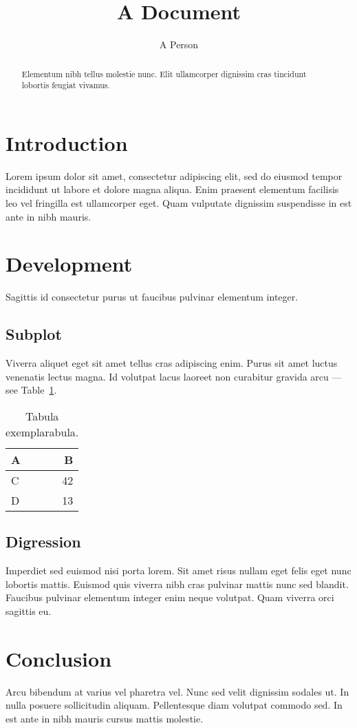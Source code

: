 \documentclass{article}
\title{A Document}
\author{A Person}
\begin{document}
\maketitle

\begin{abstract}
Elementum nibh tellus molestie nunc. Elit ullamcorper dignissim cras tincidunt lobortis feugiat vivamus.
\end{abstract}

\section{Introduction}

Lorem ipsum dolor sit amet, consectetur adipiscing elit, sed do eiusmod tempor incididunt ut labore et dolore magna aliqua. Enim praesent elementum facilisis leo vel fringilla est ullamcorper eget. Quam vulputate dignissim suspendisse in est ante in nibh mauris. 

\section{Development}

Sagittis id consectetur purus ut faucibus pulvinar elementum integer.

\subsection{Subplot}

Viverra aliquet eget sit amet tellus cras adipiscing enim. Purus sit amet luctus venenatis lectus magna. Id volutpat lacus laoreet non curabitur gravida arcu --- see Table~\ref{tab:widgets}.

\begin{table}[h]
\centering
\begin{tabular}{l|r}
A & B \\\hline
C & 42 \\
D & 13
\end{tabular}
\caption{\label{tab:widgets}Tabula exemplarabula.}
\end{table}

\subsection{Digression}

Imperdiet sed euismod nisi porta lorem. Sit amet risus nullam eget felis eget nunc lobortis mattis. Euismod quis viverra nibh cras pulvinar mattis nunc sed blandit. Faucibus pulvinar elementum integer enim neque volutpat. Quam viverra orci sagittis eu.

\section{Conclusion}

Arcu bibendum at varius vel pharetra vel. Nunc sed velit dignissim sodales ut. In nulla posuere sollicitudin aliquam. Pellentesque diam volutpat commodo sed. In est ante in nibh mauris cursus mattis molestie. 

% 
% 
\end{document}
